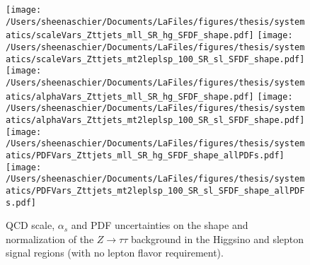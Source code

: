   \begin{figure}
  \centering
   \texttt{[image: /Users/sheenaschier/Documents/LaFiles/figures/thesis/systematics/scaleVars\_Zttjets\_mll\_SR\_hg\_SFDF\_shape.pdf]}
  \texttt{[image: /Users/sheenaschier/Documents/LaFiles/figures/thesis/systematics/scaleVars\_Zttjets\_mt2leplsp\_100\_SR\_sl\_SFDF\_shape.pdf]}
 \texttt{[image: /Users/sheenaschier/Documents/LaFiles/figures/thesis/systematics/alphaVars\_Zttjets\_mll\_SR\_hg\_SFDF\_shape.pdf]}
 \texttt{[image: /Users/sheenaschier/Documents/LaFiles/figures/thesis/systematics/alphaVars\_Zttjets\_mt2leplsp\_100\_SR\_sl\_SFDF\_shape.pdf]}
  \texttt{[image: /Users/sheenaschier/Documents/LaFiles/figures/thesis/systematics/PDFVars\_Zttjets\_mll\_SR\_hg\_SFDF\_shape\_allPDFs.pdf]}
  \texttt{[image: /Users/sheenaschier/Documents/LaFiles/figures/thesis/systematics/PDFVars\_Zttjets\_mt2leplsp\_100\_SR\_sl\_SFDF\_shape\_allPDFs.pdf]}
\caption{QCD scale, $\alpha_{s}$ and PDF uncertainties on the shape and normalization of the $Z\to\tau\tau$ background in the Higgsino and slepton signal regions (with no lepton flavor requirement).}
\label{fig:theoryUncsZtt}
 \end{figure}
 
